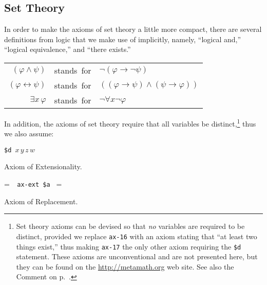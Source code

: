 \subsection{Set Theory}\label{mmsettheoryaxioms}

In order to make the axioms of set theory a little
more compact, there are several definitions from logic that we make use of
implicitly, namely, ``logical {\sc and},''
 ``logical equivalence,'' and
``there exists.''

\begin{center}\begin{tabular}{rcl}
  $( \varphi \wedge \psi )$ &\mbox{stands for}& $\neg ( \varphi
     \rightarrow \neg \psi )$\\
  $( \varphi \leftrightarrow \psi )$& \mbox{stands
     for}& $( ( \varphi \rightarrow \psi ) \wedge
     ( \psi \rightarrow \varphi ) )$\\
  $\exists x \,\varphi$ &\mbox{stands for}& $\neg \forall x \neg \varphi$
\end{tabular}\end{center}

In addition, the axioms of set theory require that all variables be
dis\-tinct,\footnote{Set theory axioms can be
devised so that {\em no} variables are required to be distinct,
provided we replace \texttt{ax-16} with an axiom stating that ``at
least two things exist,'' thus
making \texttt{ax-17} the only other axiom requiring the
\texttt{\$d} statement.  These axioms are unconventional and are not
presented here, but they can be found on the \url{http://metamath.org}
web site.  See also the Comment on
p.~\pageref{nodd}.} thus we also assume:
\begin{center}
  \texttt{\$d }$x\,y\,z\,w$
\end{center}

\noindent Axiom of Extensionality.

\setbox\startprefix=\hbox{\tt \ \ ax-ext\ \$a\ }
\setbox\contprefix=\hbox{\tt \ \ \ \ \ \ \ \ \ \ \ \ }
\startm
\m{\vdash}\m{(}\m{\forall}\m{(}\m{\in}\m{\leftrightarrow}
\m{\in}\m{)}\m{\rightarrow}\m{=}\m{)}
\endm

\noindent Axiom of Replacement.

